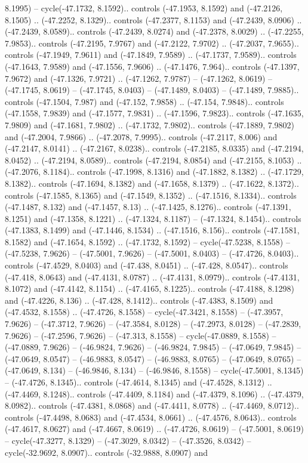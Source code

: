 \begin{scope}[shift={(2.5552, 9.9912)}]
\begin{scope}[shift={(48.1654, -14.8546)}]
8.1995) -- cycle(-47.1732, 8.1592).. controls (-47.1953, 8.1592) and (-47.2126, 8.1505) .. (-47.2252, 8.1329).. controls (-47.2377, 8.1153) and (-47.2439, 8.0906) .. (-47.2439, 8.0589).. controls (-47.2439, 8.0274) and (-47.2378, 8.0029) .. (-47.2255, 7.9853).. controls (-47.2195, 7.9767) and (-47.2122, 7.9702) .. (-47.2037, 7.9655).. controls (-47.1949, 7.9611) and (-47.1849, 7.9589) .. (-47.1737, 7.9589).. controls (-47.1643, 7.9589) and (-47.1556, 7.9606) .. (-47.1476, 7.964).. controls (-47.1397, 7.9672) and (-47.1326, 7.9721) .. (-47.1262, 7.9787) -- (-47.1262, 8.0619) -- (-47.1745, 8.0619) -- (-47.1745, 8.0403) -- (-47.1489, 8.0403) -- (-47.1489, 7.9885).. controls (-47.1504, 7.987) and (-47.152, 7.9858) .. (-47.154, 7.9848).. controls (-47.1558, 7.9839) and (-47.1577, 7.9831) .. (-47.1596, 7.9823).. controls (-47.1635, 7.9809) and (-47.1681, 7.9802) .. (-47.1732, 7.9802).. controls (-47.1889, 7.9802) and (-47.2004, 7.9866) .. (-47.2078, 7.9995).. controls (-47.2117, 8.006) and (-47.2147, 8.0141) .. (-47.2167, 8.0238).. controls (-47.2185, 8.0335) and (-47.2194, 8.0452) .. (-47.2194, 8.0589).. controls (-47.2194, 8.0854) and (-47.2155, 8.1053) .. (-47.2076, 8.1184).. controls (-47.1998, 8.1316) and (-47.1882, 8.1382) .. (-47.1729, 8.1382).. controls (-47.1694, 8.1382) and (-47.1658, 8.1379) .. (-47.1622, 8.1372).. controls (-47.1585, 8.1365) and (-47.1549, 8.1352) .. (-47.1516, 8.1334).. controls (-47.1487, 8.132) and (-47.1457, 8.13) .. (-47.1425, 8.1276).. controls (-47.1391, 8.1251) and (-47.1358, 8.1221) .. (-47.1324, 8.1187) -- (-47.1324, 8.1454).. controls (-47.1383, 8.1499) and (-47.1446, 8.1534) .. (-47.1516, 8.156).. controls (-47.1581, 8.1582) and (-47.1654, 8.1592) .. (-47.1732, 8.1592) -- cycle(-47.5238, 8.1558) -- (-47.5238, 7.9626) -- (-47.5001, 7.9626) -- (-47.5001, 8.0403) -- (-47.4726, 8.0403).. controls (-47.4529, 8.0403) and (-47.438, 8.0451) .. (-47.428, 8.0547).. controls (-47.418, 8.0643) and (-47.4131, 8.0787) .. (-47.4131, 8.0979).. controls (-47.4131, 8.1072) and (-47.4142, 8.1154) .. (-47.4165, 8.1225).. controls (-47.4188, 8.1298) and (-47.4226, 8.136) .. (-47.428, 8.1412).. controls (-47.4383, 8.1509) and (-47.4532, 8.1558) .. (-47.4726, 8.1558) -- cycle(-47.3421, 8.1558) -- (-47.3957, 7.9626) -- (-47.3712, 7.9626) -- (-47.3584, 8.0128) -- (-47.2973, 8.0128) -- (-47.2839, 7.9626) -- (-47.2596, 7.9626) -- (-47.313, 8.1558) -- cycle(-47.0889, 8.1558) -- (-47.0889, 7.9626) -- (-46.9824, 7.9626) -- (-46.9824, 7.9845) -- (-47.0649, 7.9845) -- (-47.0649, 8.0547) -- (-46.9883, 8.0547) -- (-46.9883, 8.0765) -- (-47.0649, 8.0765) -- (-47.0649, 8.134) -- (-46.9846, 8.134) -- (-46.9846, 8.1558) -- cycle(-47.5001, 8.1345) -- (-47.4726, 8.1345).. controls (-47.4614, 8.1345) and (-47.4528, 8.1312) .. (-47.4469, 8.1248).. controls (-47.4409, 8.1184) and (-47.4379, 8.1096) .. (-47.4379, 8.0982).. controls (-47.4381, 8.0868) and (-47.4411, 8.0778) .. (-47.4469, 8.0712).. controls (-47.4498, 8.0683) and (-47.4534, 8.0661) .. (-47.4576, 8.0643).. controls (-47.4617, 8.0627) and (-47.4667, 8.0619) .. (-47.4726, 8.0619) -- (-47.5001, 8.0619) -- cycle(-47.3277, 8.1329) -- (-47.3029, 8.0342) -- (-47.3526, 8.0342) -- cycle(-32.9692, 8.0907).. controls (-32.9888, 8.0907) and 
\end{scope}
\end{scope}
